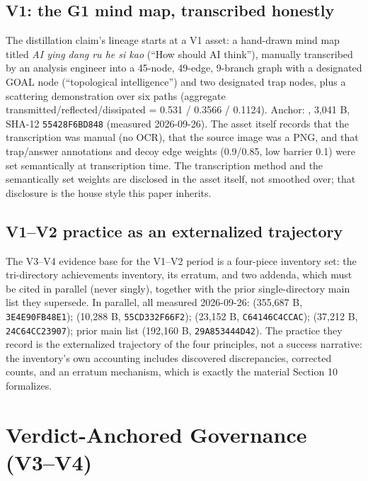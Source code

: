 \documentclass[11pt]{article}
\newcommand{\sha}[1]{\texttt{#1}}
\begin{document}
\subsection{V1: the G1 mind map, transcribed honestly}
\noindent The distillation claim's lineage starts at a V1 asset: a hand-drawn mind map titled \emph{AI ying dang ru he si kao} (``How should AI think''), manually transcribed by an analysis engineer into a 45-node, 49-edge, 9-branch graph with a designated GOAL node (``topological intelligence'') and two designated trap nodes, plus a scattering demonstration over six paths (aggregate transmitted/reflected/dissipated = 0.531 / 0.3566 / 0.1124). Anchor: , 3,041 B, SHA-12 \sha{55428F6BD848} (measured 2026-09-26). The asset itself records that the transcription was manual (no OCR), that the source image was a PNG, and that trap/answer annotations and decoy edge weights (0.9/0.85, low barrier 0.1) were set semantically at transcription time. The transcription method and the semantically set weights are disclosed in the asset itself, not smoothed over; that disclosure is the house style this paper inherits.\par
\subsection{V1–V2 practice as an externalized trajectory}
\noindent The V3–V4 evidence base for the V1–V2 period is a four-piece inventory set: the tri-directory achievements inventory, its erratum, and two addenda, which must be cited in parallel (never singly), together with the prior single-directory main list they supersede. In parallel, all measured 2026-09-26:  (355,687 B, \sha{3E4E90FB48E1});  (10,288 B, \sha{55CD332F66F2});  (23,152 B, \sha{C64146C4CCAC});  (37,212 B, \sha{24C64CC23907}); prior main list  (192,160 B, \sha{29A853444D42}). The practice they record is the externalized trajectory of the four principles, not a success narrative: the inventory's own accounting includes discovered discrepancies, corrected counts, and an erratum mechanism, which is exactly the material Section 10 formalizes.\par
\section{Verdict-Anchored Governance (V3–V4)}
\label{sec:10}
\end{document}
